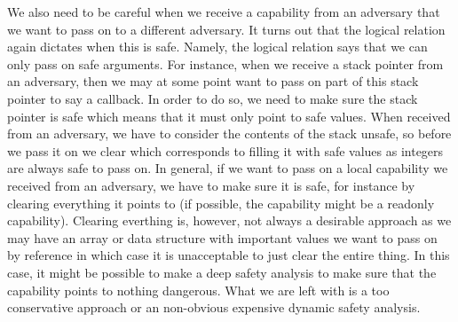 \documentclass[acmsmall,review]{acmart}\settopmatter{printfolios=true}
\begin{document}
We also need to be careful when we receive a capability from an adversary that
we want to pass on to a different adversary. It turns out that the logical
relation again dictates when this is safe. Namely, the logical relation says
that we can only pass on safe arguments. For instance, when we receive a stack
pointer from an adversary, then we may at some point want to pass on part of
this stack pointer to say a callback. In order to do so, we need to make sure
the stack pointer is safe which means that it must only point to safe
values. When received from an adversary, we have to consider the contents of the
stack unsafe, so before we pass it on we clear which corresponds to filling it
with safe values as integers are always safe to pass on. In general, if we want
to pass on a local capability we received from an adversary, we have to make
sure it is safe, for instance by clearing everything it points to (if possible,
the capability might be a readonly capability). Clearing everthing is, however,
not always a desirable approach as we may have an array or data structure with
important values we want to pass on by reference in which case it is
unacceptable to just clear the entire thing. In this case, it might be possible
to make a deep safety analysis to make sure that the capability points to
nothing dangerous. What we are left with is a too conservative approach or an
non-obvious expensive dynamic safety analysis.
\end{document}

